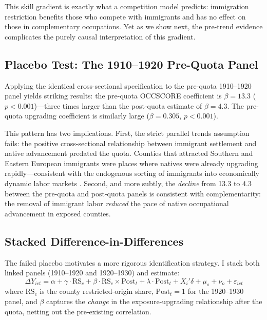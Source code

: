 \documentclass[12pt]{article}
\begin{document}
This skill gradient is exactly what a competition model predicts: immigration restriction benefits those who compete with immigrants and has no effect on those in complementary occupations. Yet as we show next, the pre-trend evidence complicates the purely causal interpretation of this gradient.



\subsection{Placebo Test: The 1910--1920 Pre-Quota Panel}

Applying the identical cross-sectional specification to the pre-quota 1910--1920 panel yields striking results: the pre-quota OCCSCORE coefficient is $\beta = 13.3$ ($p < 0.001$)---three times larger than the post-quota estimate of $\beta = 4.3$. The pre-quota upgrading coefficient is similarly large ($\beta = 0.305$, $p < 0.001$).

This pattern has two implications. First, the strict parallel trends assumption fails: the positive cross-sectional relationship between immigrant settlement and native advancement predated the quota. Counties that attracted Southern and Eastern European immigrants were places where natives were already upgrading rapidly---consistent with the endogenous sorting of immigrants into economically dynamic labor markets \citep{boustan2010}. Second, and more subtly, the \emph{decline} from 13.3 to 4.3 between the pre-quota and post-quota panels is consistent with complementarity: the removal of immigrant labor \emph{reduced} the pace of native occupational advancement in exposed counties.

\subsection{Stacked Difference-in-Differences}

The failed placebo motivates a more rigorous identification strategy. I stack both linked panels (1910--1920 and 1920--1930) and estimate:
\begin{equation}
\Delta Y_{ict} = \alpha + \gamma \cdot \text{RS}_c + \beta \cdot \text{RS}_c \times \text{Post}_t + \lambda \cdot \text{Post}_t + X_{i}'\delta + \mu_s + \nu_o + \varepsilon_{ict}
\label{eq:ddd}
\end{equation}
where $\text{RS}_c$ is the county restricted-origin share, $\text{Post}_t = 1$ for the 1920--1930 panel, and $\beta$ captures the \emph{change} in the exposure-upgrading relationship after the quota, netting out the pre-existing correlation.
\end{document}
